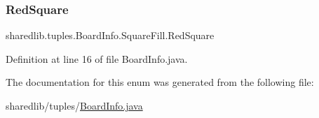\subsubsection{\texorpdfstring{Red\+Square}{RedSquare}}
{\footnotesize\ttfamily sharedlib.\+tuples.\+Board\+Info.\+Square\+Fill.\+Red\+Square}



Definition at line 16 of file Board\+Info.\+java.



The documentation for this enum was generated from the following file\+:\begin{DoxyCompactItemize}
\item 
sharedlib/tuples/\hyperlink{_board_info_8java}{Board\+Info.\+java}\end{DoxyCompactItemize}
